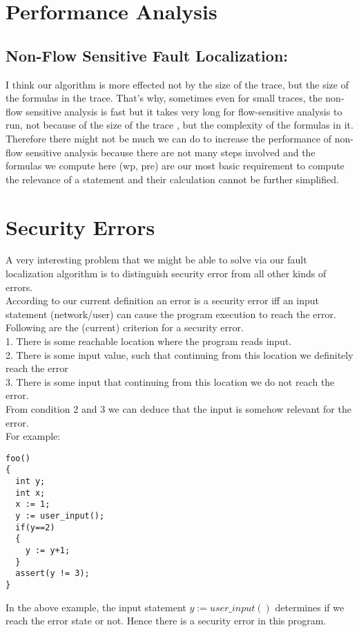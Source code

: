 \documentclass{article}
\begin{document}
\section{Performance Analysis}
\subsection{Non-Flow Sensitive Fault Localization:}
I think our algorithm is more effected not by the size of the trace, but the size of the formulas in the trace. That's why, sometimes even for small traces, the non-flow sensitive analysis is fast but it takes very long for flow-sensitive analysis to run, not because  of the size of the trace , but the complexity of the formulas in it. \\
Therefore there might not be much we can do to increase the performance of non-flow sensitive analysis because there are not many steps involved and the formulas we compute here (wp, pre) are our most basic requirement to compute the relevance of a statement and their calculation cannot be further simplified.


\section{Security Errors}
A very interesting problem that we might be able to solve via our fault localization algorithm is to distinguish security error from all other kinds of errors. \\
According to our current definition an error is a security error iff an input statement (network/user) can cause the program execution to reach the error. Following are the (current) criterion for a security error.\\
1. There is some reachable location where the program reads input.\\
2. There is some input value, such that continuing from this location we definitely reach
the error\\
3. There is some input that continuing from this location we do not reach the error.
\\
From condition 2 and 3 we can deduce that the input is somehow relevant for the error.\\
For example:
\begin{lstlisting}
foo()
{
  int y;
  int x;
  x := 1;
  y := user_input();
  if(y==2) 
  {
    y := y+1;
  }
  assert(y != 3);
}
\end{lstlisting}
In the above example, the input statement $y := user\_input()$ determines if we reach the error state or not. Hence there is a security error in this program.
\end{document}

